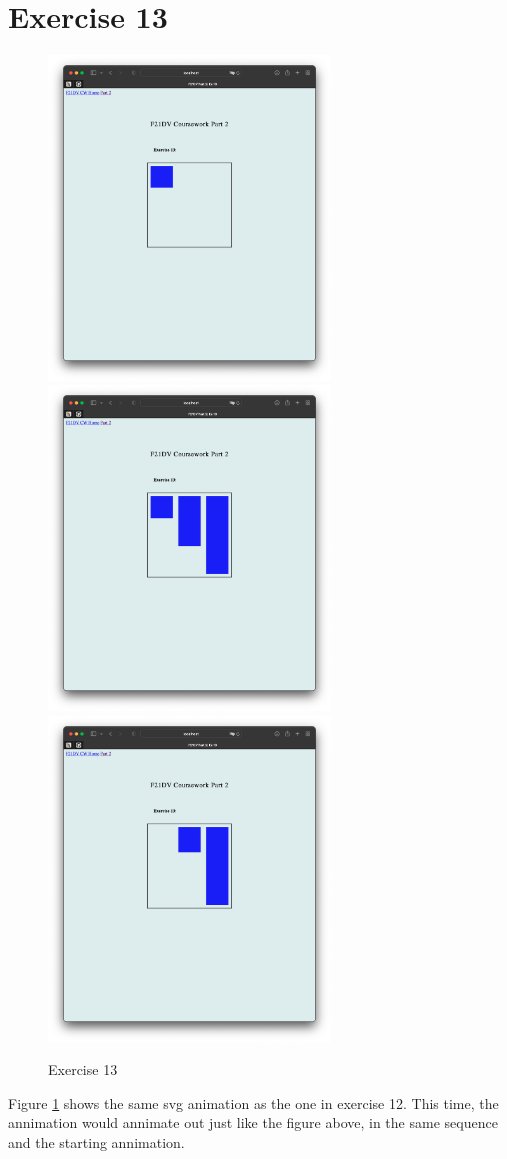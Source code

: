 \documentclass{scrreprt}
\begin{document}
\section{Exercise 13}
\begin{figure}[!ht]
    \centering
    \includegraphics[width = 7.5cm]{images/ex13_1.png}
    \includegraphics[width = 7.5cm]{images/ex13_2.png}
    \includegraphics[width = 7.5cm]{images/ex13_3.png}
    \label{fig:ex13}
    \caption{Exercise 13}
\end{figure}
\FloatBarrier
% 
Figure \ref{fig:ex13} shows the same svg animation as the one in exercise 12. This time, the annimation would annimate out just like the figure above, in the same sequence and the starting annimation.
\end{document}
